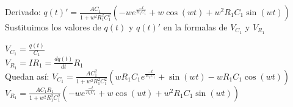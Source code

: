 \documentclass[12pt]{article}
\newcommand{\derivada}[2]{\displaystyle{\frac{d#1}{d#2}}}
\newcommand{\e}[1]{e^{#1}}
\newcommand{\escribir}[1]{\singlespacing#1\singlespacing}
\newcommand{\fraccion}[2]{\displaystyle{\frac{#1}{#2}}}
\begin{document}
	\escribir{Derivado:}
	$q(t)'=\fraccion{AC_1}{1+w^2R_1^2C_1^2}(-w\e{\frac{-t}{R_1C_1}}+w\cos(wt)+w^2R_1C_1\sin(wt))$\\
		
	\escribir{Sustituimos los valores de $q(t)$ y $q(t)'$  en la formalas de $V_{C_1}$ y $V_{R_1}$ }

	$V_{C_1}=\fraccion{q(t)}{C_1} $\\

	$V_{R_1}=IR_1=\derivada{q(t)}{t}R_1$\\

	\escribir{Quedan así:}
	$V_{C_1}=\fraccion{AC_1^2}{1+w^2R_1^2C_1^2}(wR_1C_1\e{\frac{-t}{R_1C_1}}+\sin(wt)-wR_1C_1\cos(wt))$\\

	$V_{R_1}=\fraccion{AC_1R_1}{1+w^2R_1^2C_1^2}(-w\e{\frac{-t}{R_1C_1}}+w\cos(wt)+w^2R_1C_1\sin(wt))$\\

\end{document}

